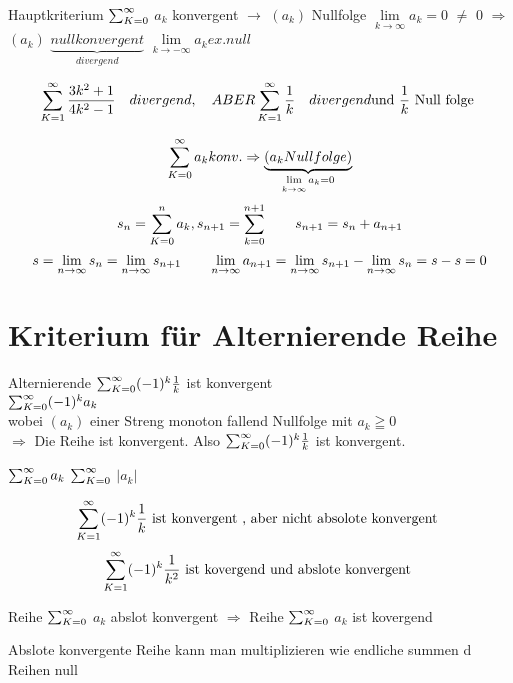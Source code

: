 Hauptkriterium $\sum_{K=0}^{\infty}$ $a_k$ konvergent $\rightarrow$ $(a_k)$ Nullfolge
$\lim\limits_{k \rightarrow \infty} a_k=0$ $\neq$ $0$ $\Rightarrow$ $(a_k)$  	$\underbrace{null konvergent }_{divergend}$
$\lim\limits_{k \rightarrow -\infty} a_k ex.null$

\begin{example}
	
	\[ \sum_{K=1}^{\infty} \frac{3k^2+1}{4k^2-1} \quad divergend, \quad ABER \sum_{K=1}^{\infty} \frac{1}{k} \quad divergend \text{und $\frac{1}{k}$ Null folge }  \]
	
	
\end{example}
\begin{example}
	\[  \sum_{K=0}^{\infty} a_k konv. \Rightarrow \underbrace{(a_k Nullfolge) }_{\lim\limits_{k \rightarrow \infty} a_k=0}  \] 
	\[s_n =\sum_{K=0}^{n} a_k , s_{n+1} =\sum_{k=0}^{n+1} \qquad s_{n+1}=s_n + a_{n+1} \]
	\[s= \lim\limits_{n \rightarrow \infty} s_n= \lim\limits_{n \rightarrow \infty} s_{n+1} \qquad \lim\limits_{n \rightarrow \infty} a_{n+1} = \lim\limits_{n \rightarrow \infty} s_{n+1} - \lim\limits_{n \rightarrow \infty} s_n = s-s=0 \]
\end{example}
\section{Kriterium für Alternierende  Reihe}
\begin{example}{Alternierende }
	$\sum_{K=0}^{\infty} (-1)^k \frac{1}{k}$ ist konvergent\\
	$\sum_{K=0}^{\infty} (-1)^k a_k$\\
	wobei $(a_k)$ einer Streng monoton fallend Nullfolge mit $a_k \geqq 0 $ \\
	$\Rightarrow$ Die Reihe ist konvergent. Also $\sum_{K=0}^{\infty} (-1)^k \frac{1}{k}$ ist konvergent.
	
\end{example}
\begin{definition}[Reihe]
	
	 $\sum_{K=0}^{\infty}  a_k$   $\sum_{K=0}^{\infty} $ $|a_k|$ 
\end{definition}
\begin{example}
	
	\[	\sum_{K=1}^{\infty} (-1)^k \frac{1}{k} \text{ ist konvergent , aber nicht absolote konvergent } \]
	\[ \sum_{K=1}^{\infty} (-1)^k \frac{1}{k^2}  \text{ ist kovergend und abslote konvergent } \]
	
\end{example}
\begin{theorem}
	Reihe $\sum_{K=0}^{\infty}$ $a_k$ abslot konvergent $\Rightarrow$ Reihe $\sum_{K=0}^{\infty}$ $a_k$ ist kovergend	
\end{theorem}
\begin{remark}
	
	Abslote konvergente Reihe kann man multiplizieren wie endliche summen d Reihen null
\end{remark}
